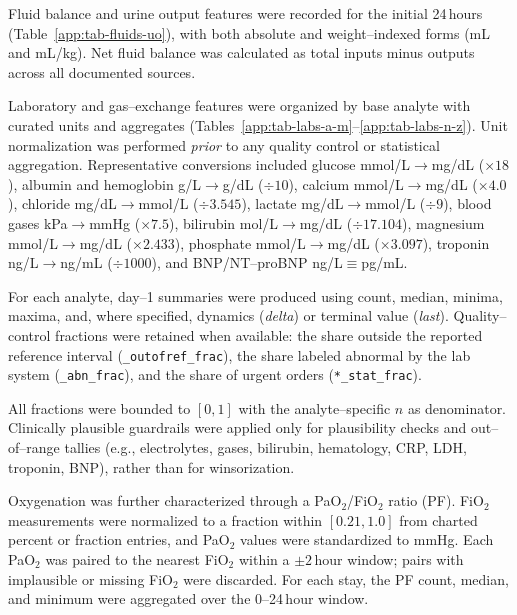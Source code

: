 \medskip
\noindent Fluid balance and urine output features were recorded for the initial 24\,hours (Table~\ref{app:tab-fluids-uo}), with both absolute and weight–indexed forms (mL and mL/kg). Net fluid balance was calculated as total inputs minus outputs across all documented sources.

\medskip
\noindent Laboratory and gas–exchange features were organized by base analyte with curated units and aggregates (Tables~\ref{app:tab-labs-a-m}–\ref{app:tab-labs-n-z}). 
Unit normalization was performed \emph{prior} to any quality control or statistical aggregation. Representative conversions included glucose mmol/L$\to$mg/dL ($\times18$), albumin and hemoglobin g/L$\to$g/dL ($\div10$), calcium mmol/L$\to$mg/dL ($\times4.0$), chloride mg/dL$\to$mmol/L ($\div3.545$), lactate mg/dL$\to$mmol/L ($\div9$), blood gases kPa$\to$mmHg ($\times7.5$), bilirubin \textmu mol/L$\to$mg/dL ($\div17.104$), magnesium mmol/L$\to$mg/dL ($\times2.433$), phosphate mmol/L$\to$mg/dL ($\times3.097$), troponin ng/L$\to$ng/mL ($\div1000$), and BNP/NT–proBNP ng/L$\equiv$pg/mL. 

For each analyte, day–1 summaries were produced using count, median, minima, maxima, and, where specified, dynamics (\textit{delta}) or terminal value (\textit{last}). Quality–control fractions were retained when available: the share outside the reported reference interval (\texttt{\_outofref\_frac}), the share labeled abnormal by the lab system (\texttt{\_abn\_frac}), and the share of urgent orders (\texttt{*\_stat\_frac}). 

All fractions were bounded to $[0,1]$ with the analyte–specific $n$ as denominator. Clinically plausible guardrails were applied only for plausibility checks and out–of–range tallies (e.g., electrolytes, gases, bilirubin, hematology, CRP, LDH, troponin, BNP), rather than for winsorization.

\medskip
\noindent Oxygenation was further characterized through a PaO$_2$/FiO$_2$ ratio (PF). FiO$_2$ measurements were normalized to a fraction within $[0.21,1.0]$ from charted percent or fraction entries, and PaO$_2$ values were standardized to mmHg. Each PaO$_2$ was paired to the nearest FiO$_2$ within a $\pm2$\,hour window; pairs with implausible or missing FiO$_2$ were discarded. For each stay, the PF count, median, and minimum were aggregated over the 0--24\,hour window.

